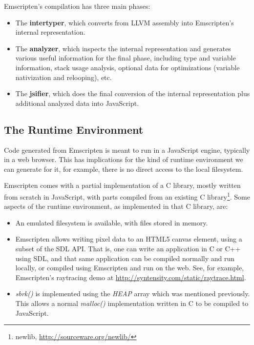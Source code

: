 \documentclass[preprint,10pt]{sigplanconf}
\begin{document}
Emscripten's compilation has three main phases:
\begin{itemize}
\item The \textbf{intertyper}, which converts from LLVM assembly into
      Emscripten's internal representation.
\item The \textbf{analyzer}, which inspects the internal representation
      and generates various useful information for the final phase,
      including type and variable information, stack usage analysis,
      optional data for optimizations
      (variable nativization and relooping), etc.
\item The \textbf{jsifier}, which does the final conversion of the
      internal representation plus additional analyzed data into JavaScript.
\end{itemize}

\subsection{The Runtime Environment}
\label{sec:runtime}

Code generated from Emscripten is meant to run in a JavaScript engine,
typically in a web browser. This has implications for the kind of
runtime environment we can generate for it, for example, there is no
direct access to the local filesystem.

Emscripten comes with a partial implementation of a C library,
mostly written from scratch in JavaScript, with parts compiled from an
existing C library\footnote{newlib, \url{http://sourceware.org/newlib/}}. Some aspects of the runtime environment, as
implemented in that C library, are:
\begin{itemize}
\item An emulated filesystem is available, with files stored in memory.
\item Emscripten allows writing pixel data to an HTML5 canvas element,
      using a subset of the SDL API. That is, one can write an application in C or C++ using
      SDL, and that same application can be compiled normally and run
      locally, or compiled using Emscripten and run on the web. See, for
      example, Emscripten's raytracing demo at \url{http://syntensity.com/static/raytrace.html}.
\item \emph{sbrk()} is implemented using the \emph{HEAP} array which
      was mentioned previously. This allows a normal \emph{malloc()}
      implementation written in C to be compiled to JavaScript.
\end{itemize}
\end{document}
